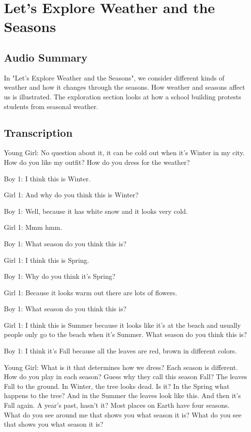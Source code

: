 \section{Let's Explore Weather and the Seasons}

\subsection{Audio Summary}

In "Let's Explore Weather and the Seasons", we consider different kinds of weather and how it changes through the seasons. How weather and seasons affect us is illustrated. The exploration section looks at how a school building protests students from seasonal weather.

\subsection{Transcription}

Young Girl: No question about it, it can be cold out when it's Winter in my city. How do you like my outfit? How do you dress for the weather?

Boy 1: I think this is Winter.

Girl 1: And why do you think this is Winter?

Boy 1: Well, because it has white snow and it looks very cold.

Girl 1: Mmm hmm.

Boy 1: What season do you think this is?

Girl 1: I think this is Spring.

Boy 1: Why do you think it's Spring?

Girl 1: Because it looks warm out there are lots of flowers.

Boy 1: What season do you think this is?

Girl 1: I think this is Summer because it looks like it's at the beach and usually people only go to the beach when it's Summer. What season do you think this is?

Boy 1: I think it's Fall because all the leaves are red, brown in different colors.

Young Girl: What is it that determines how we dress? Each season is different. How do you play in each season? Guess why they call this season Fall? The leaves Fall to the ground. In Winter, the tree looks dead. Is it? In the Spring what happens to the tree? And in the Summer the leaves look like this. And then it's Fall again. A year's past, hasn't it? Most places on Earth have four seasons. What do you see around me that shows you what season it is? What do you see that shows you what season it is?

